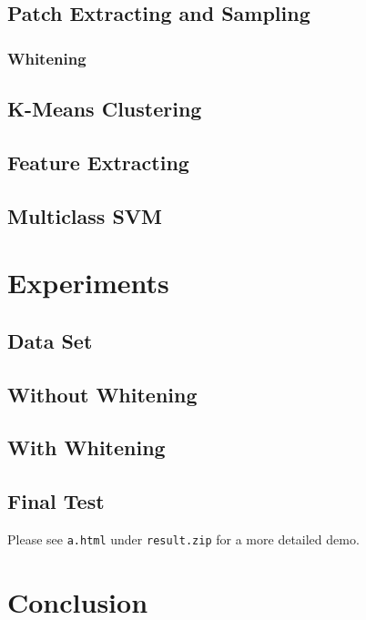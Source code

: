 \documentclass{acm_proc_article-sp}
\begin{document}
\subsection{Patch Extracting and Sampling}
\subsubsection{Whitening}

\subsection{K-Means Clustering}

\subsection{Feature Extracting}

\subsection{Multiclass SVM}

\section{Experiments}

\subsection{Data Set}

\subsection{Without Whitening}

\subsection{With Whitening}

\subsection{Final Test}

Please see \texttt{a.html} under \texttt{result.zip} for a more detailed demo.

\section{Conclusion}

\nocite{*}

 

\balancecolumns
\end{document}
